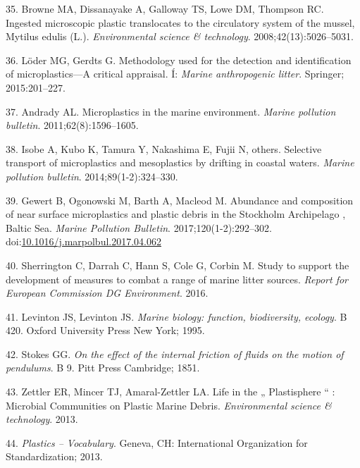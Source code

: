 \documentclass[icelandic,]{book}
\begin{document}
\leavevmode\hypertarget{ref-browne2008ingested}{}%
35. Browne MA, Dissanayake A, Galloway TS, Lowe DM, Thompson RC. Ingested microscopic plastic translocates to the circulatory system of the mussel, Mytilus edulis (L.). \emph{Environmental science \& technology}. 2008;42(13):5026--5031.

\leavevmode\hypertarget{ref-loder2015methodology}{}%
36. Löder MG, Gerdts G. Methodology used for the detection and identification of microplastics---A critical appraisal. Í: \emph{Marine anthropogenic litter}. Springer; 2015:201--227.

\leavevmode\hypertarget{ref-andrady2011microplastics}{}%
37. Andrady AL. Microplastics in the marine environment. \emph{Marine pollution bulletin}. 2011;62(8):1596--1605.

\leavevmode\hypertarget{ref-isobe2014selective}{}%
38. Isobe A, Kubo K, Tamura Y, Nakashima E, Fujii N, others. Selective transport of microplastics and mesoplastics by drifting in coastal waters. \emph{Marine pollution bulletin}. 2014;89(1-2):324--330.

\leavevmode\hypertarget{ref-Gewert2017}{}%
39. Gewert B, Ogonowski M, Barth A, Macleod M. Abundance and composition of near surface microplastics and plastic debris in the Stockholm Archipelago , Baltic Sea. \emph{Marine Pollution Bulletin}. 2017;120(1-2):292--302. doi:\href{https://doi.org/10.1016/j.marpolbul.2017.04.062}{10.1016/j.marpolbul.2017.04.062}

\leavevmode\hypertarget{ref-sherrington2016study}{}%
40. Sherrington C, Darrah C, Hann S, Cole G, Corbin M. Study to support the development of measures to combat a range of marine litter sources. \emph{Report for European Commission DG Environment}. 2016.

\leavevmode\hypertarget{ref-levinton1995marine}{}%
41. Levinton JS, Levinton JS. \emph{Marine biology: function, biodiversity, ecology}. B 420. Oxford University Press New York; 1995.

\leavevmode\hypertarget{ref-stokes1851effect}{}%
42. Stokes GG. \emph{On the effect of the internal friction of fluids on the motion of pendulums}. B 9. Pitt Press Cambridge; 1851.

\leavevmode\hypertarget{ref-Zettler2013}{}%
43. Zettler ER, Mincer TJ, Amaral-Zettler LA. Life in the „ Plastisphere `` : Microbial Communities on Plastic Marine Debris. \emph{Environmental science \& technology}. 2013.

\leavevmode\hypertarget{ref-ISO472}{}%
44. \emph{Plastics -- Vocabulary}. Geneva, CH: International Organization for Standardization; 2013.
\end{document}
